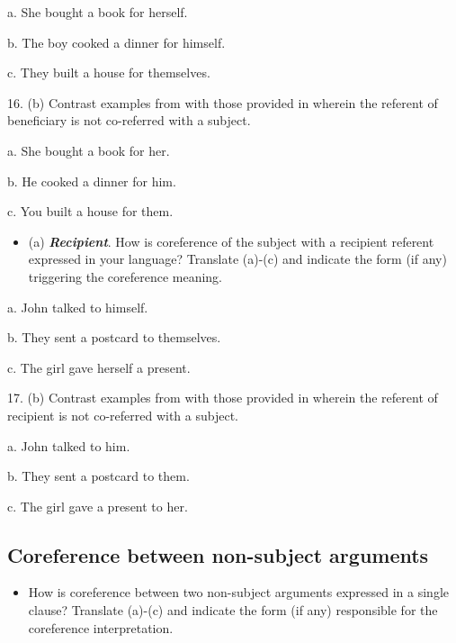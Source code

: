 \documentclass[output=paper]{langsci/langscibook} \label{AppendixA}
\begin{document}
a. She bought a book for herself. 



b. The boy cooked a dinner for himself. 



c. They built a house for themselves. 



16. (b) Contrast examples from  with those provided in  wherein the referent of beneficiary is not co-referred with a subject. 



a. She bought a book for her. 



b. He cooked a dinner for him. 



c. You built a house for them. 


\begin{itemize}
\item
(a) \textbf{\textit{Recipient}}. How is coreference of the subject with a recipient referent expressed in your language? Translate (a)-(c) and indicate the form (if any) triggering the coreference meaning. 

\end{itemize}

a. John talked to himself. 



b. They sent a postcard to themselves. 



c. The girl gave herself a present.



17. (b) Contrast examples from  with those provided in  wherein the referent of recipient is not co-referred with a subject. 



a. John talked to him. 



b. They sent a postcard to them. 



c. The girl gave a present to her. 


\subsection{Coreference between non-subject arguments} 
\begin{itemize}
\item
How is coreference between two non-subject arguments expressed in a single clause? Translate (a)-(c) and indicate the form (if any) responsible for the coreference interpretation. 

\end{itemize}
\end{document}

